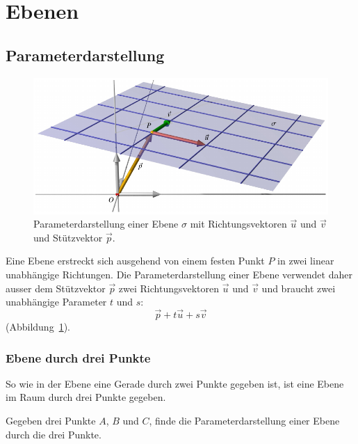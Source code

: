 %
%
%
\section{Ebenen\label{section:ebenen}}

\subsection{Parameterdarstellung}
\begin{figure}
\centering
\includegraphics{3/images/ebene.pdf}
\caption{Parameterdarstellung einer Ebene $\sigma$ mit Richtungsvektoren
$\vec{u}$ und $\vec{v}$ und Stützvektor $\vec{p}$.
\label{skript:affin:ebene}}
\end{figure}
Eine Ebene erstreckt sich ausgehend von einem festen Punkt $P$ in
zwei linear unabhängige Richtungen.
Die Parameterdarstellung einer Ebene verwendet daher ausser dem
Stützvektor $\vec{p}$ zwei Richtungsvektoren $\vec{u}$ und $\vec{v}$
und braucht zwei unabhängige Parameter $t$ und $s$:
\begin{equation}
\vec{p} + t\vec{u} + s\vec{v}
\label{skript:affin:ebene:parameterdarstellung}
\end{equation}
(Abbildung~\ref{skript:affin:ebene}).

\subsubsection{Ebene durch drei Punkte}
So wie in der Ebene eine Gerade durch zwei Punkte gegeben ist, ist eine
Ebene im Raum durch drei Punkte gegeben.

\begin{aufgabe}
Gegeben drei Punkte $A$, $B$ und $C$, finde die Parameterdarstellung einer
Ebene durch die drei Punkte.
\end{aufgabe}

